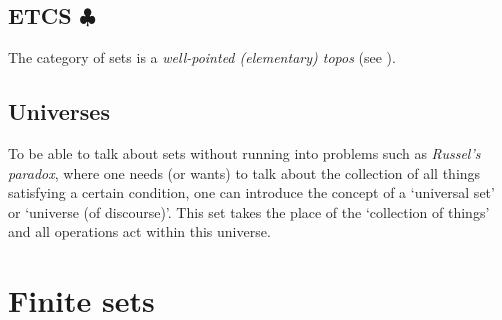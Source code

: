 
\subsection{\texorpdfstring{ETCS $\clubsuit$}{ETCS}}


    \begin{axiom}
        The category of sets is a \textit{well-pointed (elementary) topos} (see ).
    \end{axiom}


\subsection{Universes}\label{section:universes}

    To be able to talk about sets without running into problems such as \textit{Russel's paradox}, where one needs (or wants) to talk about the collection of all things satisfying a certain condition, one can introduce the concept of a `universal set' or `universe (of discourse)'. This set takes the place of the `collection of things' and all operations act within this universe.


\section{Finite sets}


